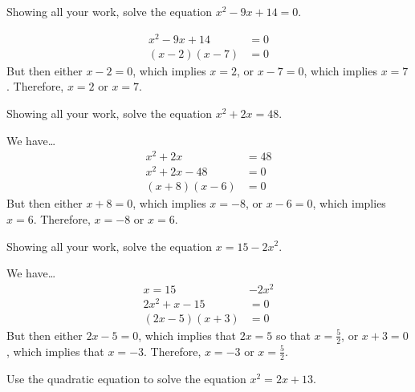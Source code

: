 \documentclass[11pt,letterpaper]{article}
\begin{document}
\newpage



 Showing all your work, solve the equation $x^2 - 9x + 14= 0$. \pspace

\sol
	\[
	\begin{aligned}
	x^2 - 9x + 14&= 0 \\[0.3cm]
	(x - 2)(x - 7)&= 0
	\end{aligned}
	\] \pspace
But then either $x - 2=0$, which implies $x= 2$, or $x - 7= 0$, which implies $x= 7$. Therefore, $x= 2$ or $x= 7$. 



\newpage



 Showing all your work, solve the equation $x^2 + 2x= 48$. \pspace

\sol We have\dots \pspace
	\[
	\begin{aligned}
	x^2 + 2x&= 48 \\[0.3cm]
	x^2 + 2x - 48&= 0 \\[0.3cm]
	(x + 8)(x - 6)&= 0 
	\end{aligned}
	\] \pspace
But then either $x + 8= 0$, which implies $x= -8$, or $x - 6= 0$, which implies $x= 6$. Therefore, $x= -8$ or $x= 6$. 



\newpage



 Showing all your work, solve the equation $x= 15 - 2x^2$. \pspace

\sol We have\dots \pspace
	\[
	\begin{aligned}
	x= 15 &- 2x^2 \\[0.3cm]
	2x^2 + x - 15&= 0 \\[0.3cm]
	(2x - 5)(x + 3)&= 0 
	\end{aligned}
	\] \pspace
But then either $2x - 5= 0$, which implies that $2x= 5$ so that $x= \frac{5}{2}$, or $x + 3= 0$, which implies that $x= -3$. Therefore, $x= -3$ or $x= \frac{5}{2}$. 



\newpage



 Use the quadratic equation to solve the equation $x^2= 2x + 13$. \pspace
\end{document}
